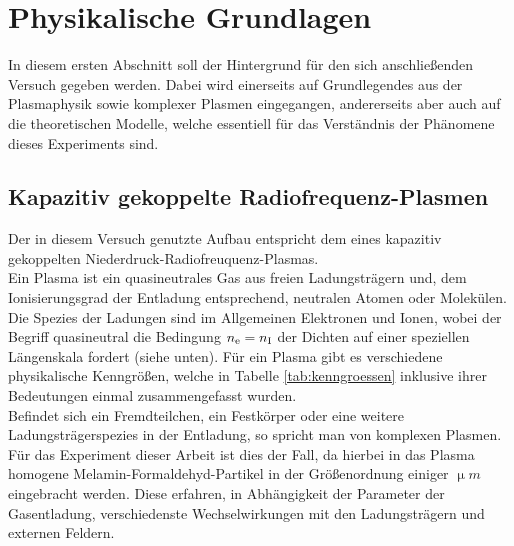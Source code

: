 \chapter{Physikalische Grundlagen}\label{sec:physg}

  In diesem ersten Abschnitt soll der Hintergrund f\"ur den sich anschlie{\ss}enden Versuch gegeben werden. Dabei wird einerseits auf Grundlegendes aus der Plasmaphysik sowie komplexer Plasmen eingegangen, andererseits aber auch auf die theoretischen Modelle, welche essentiell f\"ur das Verst\"andnis der Ph\"anomene dieses Experiments sind.

  \section{Kapazitiv gekoppelte Radiofrequenz-Plasmen} \label{sub:kaprfplasm}

    Der in diesem Versuch genutzte Aufbau entspricht dem eines kapazitiv gekoppelten Niederdruck-Radiofreuquenz-Plasmas.\\
    Ein Plasma ist ein quasineutrales Gas aus freien Ladungsträgern und, dem Ionisierungsgrad der Entladung entsprechend, neutralen Atomen oder Molekülen. Die Spezies der Ladungen sind im Allgemeinen Elektronen und Ionen, wobei der Begriff quasineutral die Bedingung $n_\text{e}=n_\text{I}$ der Dichten auf einer speziellen Längenskala fordert (siehe unten). Für ein Plasma gibt es verschiedene physikalische Kenngrößen, welche in Tabelle \ref{tab:kenngroessen} inklusive ihrer Bedeutungen einmal zusammengefasst wurden.\\
    Befindet sich ein Fremdteilchen, ein Festkörper oder eine weitere Ladungsträgerspezies in der Entladung, so spricht man von komplexen Plasmen. Für das Experiment dieser Arbeit ist dies der Fall, da hierbei in das Plasma homogene Melamin-Formaldehyd-Partikel in der Größenordnung einiger $\unit{\upmu m}$ eingebracht werden. Diese erfahren, in Abhängigkeit der Parameter der Gasentladung, verschiedenste Wechselwirkungen mit den Ladungsträgern und externen Feldern.

